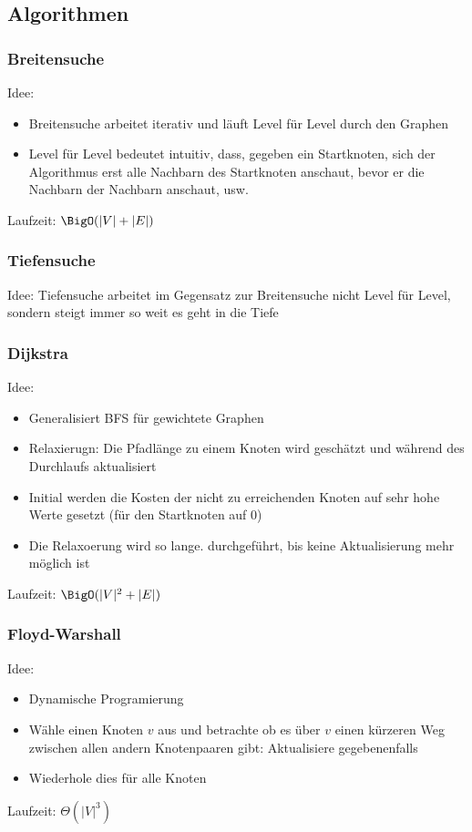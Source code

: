 \documentclass[a4paper]{article}
\begin{document}
	\subsection{Algorithmen}
	\subsubsection{Breitensuche}
		Idee: 
		\begin{itemize}
		  \item Breitensuche arbeitet iterativ und läuft Level für Level durch den Graphen
		  \item Level für Level bedeutet intuitiv, dass, gegeben ein Startknoten, sich der Algorithmus erst alle Nachbarn des Startknoten anschaut, bevor er die Nachbarn der Nachbarn anschaut, usw.
		\end{itemize}
		Laufzeit: $\BigO(|V|+|E|)$
	\subsubsection{Tiefensuche}
		Idee: Tiefensuche arbeitet im Gegensatz zur Breitensuche nicht Level für Level, sondern steigt immer so weit es geht in die Tiefe
	\subsubsection{Dijkstra}
		Idee:
		\begin{itemize}
		  \item Generalisiert BFS für gewichtete Graphen
		  \item Relaxierugn: Die Pfadlänge zu einem Knoten wird geschätzt und während des Durchlaufs aktualisiert 
		  \item Initial werden die Kosten der nicht zu erreichenden Knoten auf sehr hohe Werte gesetzt (für den Startknoten auf 0) 
		  \item Die Relaxoerung wird so lange. durchgeführt, bis keine Aktualisierung mehr möglich ist
		\end{itemize}
		Laufzeit: $\BigO(|V|^2+|E|)$
	\subsubsection{Floyd-Warshall}
		Idee:
		\begin{itemize}
		  \item Dynamische Programierung
		  \item Wähle einen Knoten $v$ aus und betrachte ob es über $v$ einen kürzeren Weg zwischen allen andern Knotenpaaren gibt: Aktualisiere gegebenenfalls 
		  \item Wiederhole dies für alle Knoten
		\end{itemize}
		Laufzeit: $\Theta(|V|^3)$
\end{document}
